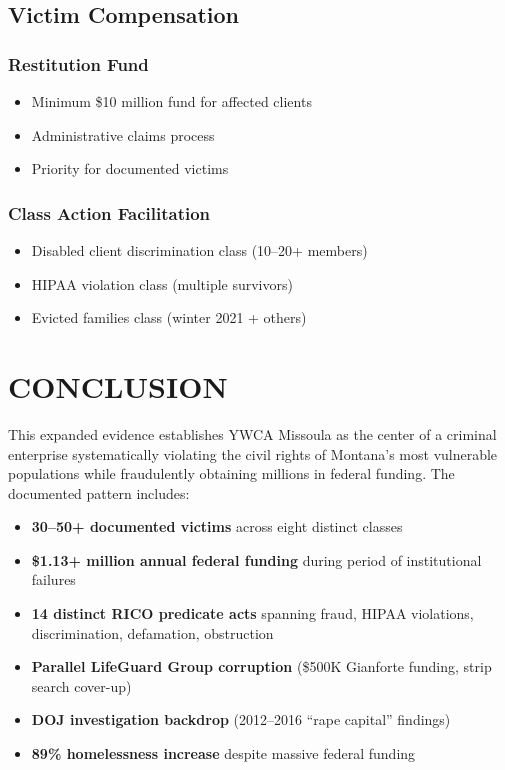 \documentclass[11pt,letterpaper]{article}
\renewcommand{\checkmark}{\ding{51}}
\begin{document}
\subsection{Victim Compensation}

\subsubsection{Restitution Fund}
\begin{itemize}[leftmargin=*]
\item Minimum \$10 million fund for affected clients
\item Administrative claims process
\item Priority for documented victims
\end{itemize}

\subsubsection{Class Action Facilitation}
\begin{itemize}[leftmargin=*]
\item Disabled client discrimination class (10--20+ members)
\item HIPAA violation class (multiple survivors)
\item Evicted families class (winter 2021 + others)
\end{itemize}

\newpage

\section{CONCLUSION}

This expanded evidence establishes YWCA Missoula as the center of a criminal enterprise systematically violating the civil rights of Montana's most vulnerable populations while fraudulently obtaining millions in federal funding. The documented pattern includes:

\begin{itemize}[leftmargin=*]
\item[\checkmark] \textbf{30--50+ documented victims} across eight distinct classes
\item[\checkmark] \textbf{\$1.13+ million annual federal funding} during period of institutional failures
\item[\checkmark] \textbf{14 distinct RICO predicate acts} spanning fraud, HIPAA violations, discrimination, defamation, obstruction
\item[\checkmark] \textbf{Parallel LifeGuard Group corruption} (\$500K Gianforte funding, strip search cover-up)
\item[\checkmark] \textbf{DOJ investigation backdrop} (2012--2016 ``rape capital'' findings)
\item[\checkmark] \textbf{89\% homelessness increase} despite massive federal funding
\end{itemize}
\end{document}
